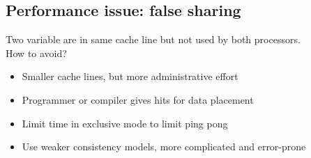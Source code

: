 \documentclass[a4paper]{article}
\begin{document}
\subsection{Performance issue: false sharing}
Two variable are in same cache line but not used by both processors.
\\How to avoid?
\begin{itemize}
    \item Smaller cache lines, but more administrative effort
    \item Programmer or compiler gives hits for data placement
    \item Limit time in exclusive mode to limit ping pong
    \item Use weaker consistency models, more complicated and error-prone
\end{itemize}
\end{document}
